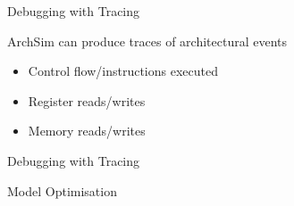 \begin{frame}{Debugging with Tracing}

ArchSim can produce traces of architectural events
\begin{itemize}
\item Control flow/instructions executed
\item Register reads/writes
\item Memory reads/writes
\end{itemize}

\end{frame}

\begin{frame}{Debugging with Tracing}

\end{frame}

\begin{frame}{Model Optimisation}

% 

\end{frame}
